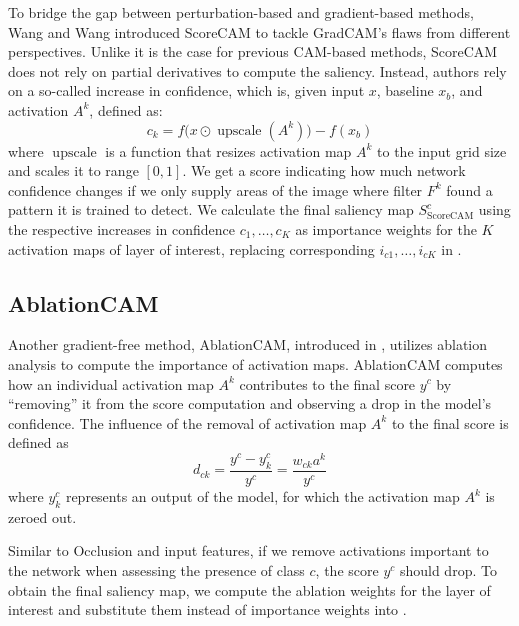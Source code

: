 To bridge the gap between perturbation-based and gradient-based methods, Wang and Wang \cite{score-cam} introduced ScoreCAM to tackle GradCAM's flaws from different perspectives.
Unlike it is the case for previous CAM-based methods, ScoreCAM does not rely on partial derivatives to compute the saliency.
Instead, authors rely on a so-called increase in confidence, which is, given input $x$, baseline $x_b$, and activation $A^k$, defined as:
\begin{equation}
    c_k = f\bigl(x \odot \operatorname{upscale}(A^k)\bigr) - f(x_b)
\end{equation}
where $\operatorname{upscale}$ is a function that resizes activation map $A^k$ to the input grid size and scales it to range $[0, 1]$.
We get a score indicating how much network confidence changes if we only supply areas of the image where filter $F^k$ found a pattern it is trained to detect.
We calculate the final saliency map $S^c_{\text{ScoreCAM}}$ using the respective increases in confidence $c_1, \ldots, c_K$ as importance weights for the $K$ activation maps of layer of interest, replacing corresponding $i_{c1}, \ldots, i_{cK}$ in .

\subsection{AblationCAM}

Another gradient-free method, AblationCAM, introduced in \cite{ablation-cam}, utilizes ablation analysis to compute the importance of activation maps.
AblationCAM computes how an individual activation map $A^k$ contributes to the final score $y^c$ by ``removing'' it from the score computation and observing a drop in the model's confidence.
The influence of the removal of activation map $A^k$ to the final score is defined as
\begin{equation}\label{eq:ablation-cam-importance-weight}
    d_{ck} = \frac{y^c - y^c_k}{y^c} = \frac{w_{ck}a^k}{y^c}
\end{equation}
where $y^c_k$ represents an output of the model, for which the activation map $A^k$ is zeroed out.

Similar to Occlusion and input features, if we remove activations important to the network when assessing the presence of class $c$, the score $y^c$ should drop. To obtain the final saliency map, we compute the ablation weights for the layer of interest and substitute them instead of importance weights into .

